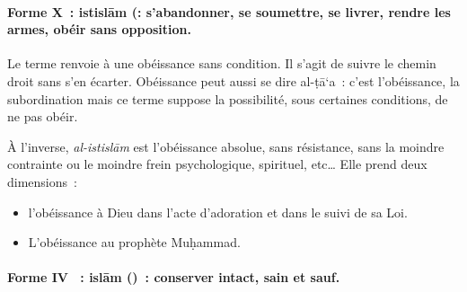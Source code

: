\paragraph{Forme X~: istislām (:
s'abandonner, se soumettre, se livrer, rendre les armes, obéir sans
opposition.} Le terme renvoie à une obéissance sans condition. Il s'agit de suivre le
chemin droit sans s'en écarter.
Obéissance peut aussi se dire al-ṭā`a~: c'est l'obéissance, la subordination mais ce terme suppose la possibilité, sous certaines conditions, de ne pas obéir.



À l'inverse, \emph{al-istislām} est l'obéissance absolue, sans
résistance, sans la moindre contrainte ou le moindre frein
psychologique, spirituel, etc\ldots{} Elle prend deux dimensions~:
\begin{itemize}
    \item l'obéissance à Dieu dans l'acte d'adoration et dans le suivi de sa Loi.
    \item L'obéissance au prophète Muḥammad.
\end{itemize}



\paragraph{ Forme IV~ : islām ()~:
conserver intact, sain et sauf.
}

